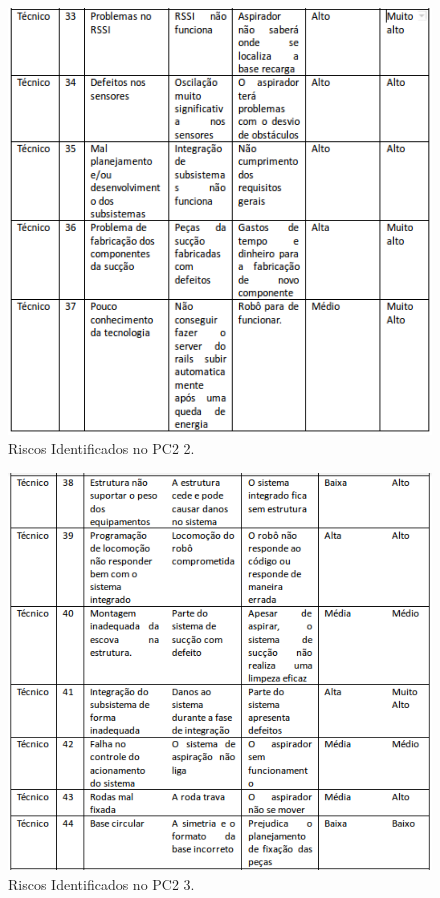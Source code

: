 \begin{figure}[H]
	\centering
	\includegraphics[scale=1]{figuras/riscos_pc2_2.png}
	\caption{Riscos Identificados no PC2 2.}
	\label{img:riscospc22}
\end{figure}

\begin{figure}[H]
	\centering
	\includegraphics[scale=0.9]{figuras/riscos_pc2_3.png}
	\caption{Riscos Identificados no PC2 3.}
	\label{img:riscospc23}
\end{figure}

